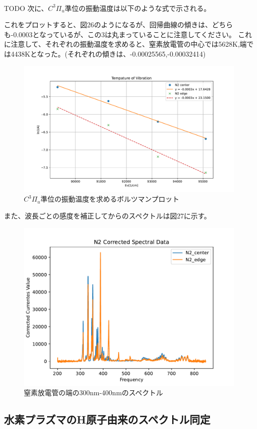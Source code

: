 \documentclass[a4j,twocolumn]{jsarticle}
\begin{document}
\\

TODO
次に、$C^3\varPi_u$準位の振動温度は以下のような式で示される。

これをプロットすると、図26のようになるが、回帰曲線の傾きは、どちらも-0.0003となっているが、この3は丸まっていることに注意してください。
これに注意して、それぞれの振動温度を求めると、窒素放電管の中心では5628K,端では4438Kとなった。(それぞれの傾きは、-0.00025565,-0.00032414)

\begin{figure}[htb]
    \centering
    \includegraphics[keepaspectratio,width=0.6\columnwidth]{fig/temp.pdf}
    \caption{$C^3\varPi_u$準位の振動温度を求めるボルツマンプロット}
\end{figure}



また、波長ごとの感度を補正してからのスペクトルは図27に示す。

\begin{figure}[htb]
    \centering
    \includegraphics[keepaspectratio,width=0.6\columnwidth]{fig/hahaha.pdf}
    \caption{窒素放電管の端の300nm-400nmのスペクトル}
\end{figure}





\subsection*{水素プラズマのH原子由来のスペクトル同定}
\end{document}
